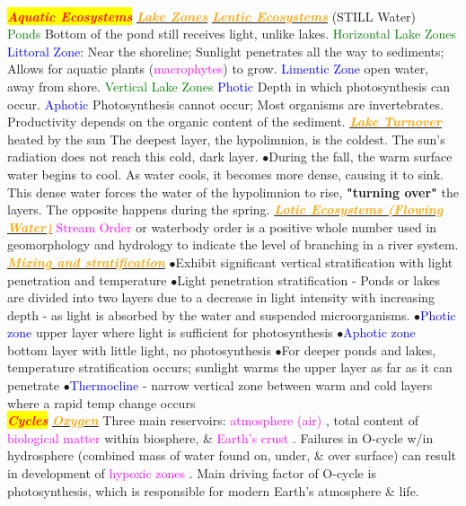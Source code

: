 \documentclass{article}
\newcommand{\ddd}{$\bullet$}
\newcommand{\red}[1]{\textcolor{red}{#1}}
\newcommand{\green}[1]{\textcolor{green}{#1}}
\newcommand{\blue}[1]{\textcolor{blue}{#1}}
\newcommand{\pink}[1]{\textcolor{magenta}{#1}}
\newcommand{\orange}[1]{\textcolor{orange}{#1}}
\newcommand{\mysection}[1]{\colorbox{yellow}{\textbf{\textit{\red{#1}}}}}
\newcommand{\mysubsection}[1]{\underline{\textbf{{\textit{\orange{#1}}}}}}
\newcommand{\mysubsub}[1]{{{\green{#1}}}}
\newcommand{\mysubsubsub}[1]{{{\blue{#1}}}}
\newcommand{\vocab}[1]{{\pink{#1}}}
\begin{document}
\begin{multicols*}{4}
    \\
    \mysection{Aquatic Ecosystems}
        \mysubsection{Lake Zones}
            \mysubsection{Lentic Ecosystems} (STILL Water) \\
            \mysubsub{Ponds} Bottom of the pond still receives light, unlike lakes.
            \mysubsub{Horizontal Lake Zones}
                \mysubsubsub{Littoral Zone}: Near the shoreline; Sunlight penetrates all the way to sediments; Allows for aquatic plants (\vocab{macrophytes}) to grow.
                \mysubsubsub{Limentic Zone} open water, away from shore.
            \mysubsub{Vertical Lake Zones}
                \mysubsubsub{Photic}
                    Depth in which photosynthesis can occur.
                \mysubsubsub{Aphotic}
                Photosynthesis cannot occur; Most organisms are invertebrates. Productivity depends on the organic content of the sediment.
          \mysubsection{Lake Turnover}
               heated by the sun The deepest layer, the hypolimnion, is the coldest. The sun's radiation does not reach this cold, dark layer. 
        	  \ddd During the fall, the warm surface water begins to cool. As water cools, it becomes more dense, causing it to sink. This dense water forces the water of the hypolimnion to rise, \textbf{"turning over"} the layers. The opposite happens during the spring.
        	  \mysubsection{Lotic Ecosystems (Flowing Water)}
        	  \vocab{Stream Order} or waterbody order is a positive whole number used in geomorphology and hydrology to indicate the level of branching in a river system. 
        \mysubsection{Mixing and stratification}
            \ddd Exhibit significant vertical stratification with light penetration and temperature 
            \ddd Light penetration stratification - Ponds or lakes are divided into two layers due to a decrease in light intensity with increasing depth - as light is absorbed by the water and suspended microorganisms.
            \ddd \blue{Photic zone} upper layer where light is sufficient for photosynthesis
            \ddd \blue{Aphotic zone} bottom layer with little light, no photosynthesis
            \ddd For deeper ponds and lakes, temperature stratification occurs; sunlight warms the upper layer as far as it can penetrate
            \ddd \blue{Thermocline} - narrow vertical zone between warm and cold layers where a rapid temp change occurs 
   	\\
	\mysection{Cycles}
		\mysubsection{Oxygen}
		Three main reservoirs: \pink{ atmosphere (air) }, total content of \pink{ biological matter } within biosphere, \& \pink{ Earth's crust }. Failures in O-cycle w/in hydrosphere (combined mass of water found on, under, \& over surface) can result in development of \pink{ hypoxic zones }. Main driving factor of O-cycle is photosynthesis, which is responsible for modern Earth's atmosphere \& life. 

\end{multicols*}
\end{document}
